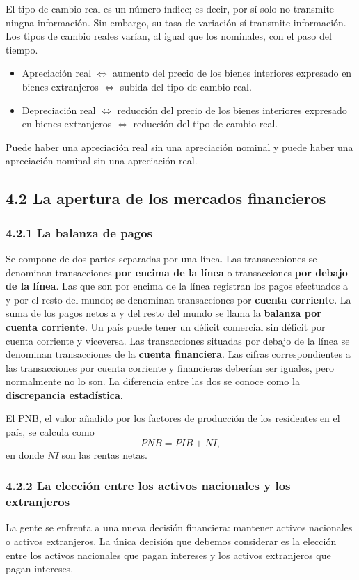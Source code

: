 \documentclass[10pt, landscape]{article}
\begin{document}
\begin{multicols*}{3}
El tipo de cambio real es un número índice; es decir, por sí solo no transmite ningna información. Sin embargo, su tasa de variación sí transmite información. Los tipos de cambio reales varían, al igual que los nominales, con el paso del tiempo.

\begin{itemize}
\item Apreciación real $\iff$ aumento del precio de los bienes interiores expresado en bienes extranjeros $\iff$ subida del tipo de cambio real.
\item Depreciación real $\iff$ reducción del precio de los bienes interiores expresado en bienes extranjeros $\iff$ reducción del tipo de cambio real.
\end{itemize}

Puede haber una apreciación real sin una apreciación nominal y puede haber una apreciación nominal sin una apreciación real.

\subsection{4.2 La apertura de los mercados financieros}
\subsubsection{4.2.1 La balanza de pagos}
Se compone de dos partes separadas por una línea. Las transaccoiones se denominan transacciones \textbf{por encima de la línea} o transacciones \textbf{por debajo de la línea}. Las que son por encima de la línea registran los pagos efectuados a y por el resto del mundo; se denominan transacciones por \textbf{cuenta corriente}. La suma de los pagos netos a y del resto del mundo se llama la \textbf{balanza por cuenta corriente}. Un país puede tener un déficit comercial sin déficit por cuenta corriente y viceversa. Las transacciones situadas por debajo de la línea se denominan transacciones de la \textbf{cuenta financiera}. Las cifras correspondientes a las transacciones por cuenta corriente y financieras deberían ser iguales, pero normalmente no lo son. La diferencia entre las dos se conoce como la \textbf{discrepancia estadística}.

El PNB, el valor añadido por los factores de producción de los residentes en el país, se calcula como
\[ \textit{PNB} = \textit{PIB} + \textit{NI},\]
en donde \textit{NI} son las rentas netas.

\subsubsection{4.2.2 La elección entre los activos nacionales y los extranjeros}
La gente se enfrenta a una nueva decisión financiera: mantener activos nacionales o activos extranjeros. La única decisión que debemos considerar es la elección entre los activos nacionales que pagan intereses y los activos extranjeros que pagan intereses.


\end{multicols*}
\end{document}

